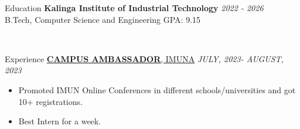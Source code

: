 \documentclass{resume} %
\begin{document}

\begin{rSection}{Education}
{\bf Kalinga Institute of Industrial Technology} \hfill {\em 2022 - 2026} 
\\ B.Tech, Computer Science and Engineering \hfill { GPA: 9.15 }

\\

\end{rSection}
\begin{rSection}{Experience}
\href{https://1drv.ms/i/s!AqmF3ryI8xyngdlvi5puoHlWRF5NTQ?e=hyfCRH}{{\bf CAMPUS AMBASSADOR}{, IMUNA}} \hfill {\em JULY, 2023- AUGUST, 2023}
\begin{itemize}
    \item Promoted IMUN Online Conferences in different schools/universities and got 10+ registrations.
    \item Best Intern for a week.
\end{itemize}

\end{rSection}
\end{document}
